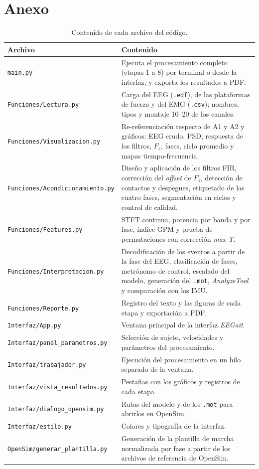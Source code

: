 \documentclass[10pt]{article}
\begin{document}
\section{Anexo}

\begin{table}[H]
\centering
\small
\footnotesize
\begin{tabular}{>{\raggedright\arraybackslash}p{4.6cm}>{\raggedright\arraybackslash}p{9.5cm}}
\toprule
Archivo & Contenido \\
\midrule
\texttt{main.py} & Ejecuta el procesamiento completo (etapas 1 a 8) por terminal o desde la interfaz, y exporta los resultados a PDF. \\
\texttt{Funciones/Lectura.py} & Carga del EEG (\texttt{.edf}), de las plataformas de fuerza y del EMG (\texttt{.csv}); nombres, tipos y montaje 10--20 de los canales. \\
\texttt{Funciones/Visualizacion.py} & Re-referenciación respecto de A1 y A2 y gráficos: EEG crudo, PSD, respuesta de los filtros, $F_z$, fases, ciclo promedio y mapas tiempo-frecuencia. \\
\texttt{Funciones/Acondicionamiento.py} & Diseño y aplicación de los filtros FIR, corrección del \textit{offset} de $F_z$, detección de contactos y despegues, etiquetado de las cuatro fases, segmentación en ciclos y control de calidad. \\
\texttt{Funciones/Features.py} & STFT continua, potencia por banda y por fase, índice GPM y prueba de permutaciones con corrección \textit{max-T}. \\
\texttt{Funciones/Interpretacion.py} & Decodificación de los eventos a partir de la fase del EEG, clasificación de fases, metrónomo de control, escalado del modelo, generación del \texttt{.mot}, \textit{AnalyzeTool} y comparación con los IMU. \\
\texttt{Funciones/Reporte.py} & Registro del texto y las figuras de cada etapa y exportación a PDF. \\
\texttt{Interfaz/App.py} & Ventana principal de la interfaz \textit{EEGait}. \\
\texttt{Interfaz/panel\_parametros.py} & Selección de sujeto, velocidades y parámetros del procesamiento. \\
\texttt{Interfaz/trabajador.py} & Ejecución del procesamiento en un hilo separado de la ventana. \\
\texttt{Interfaz/vista\_resultados.py} & Pestañas con los gráficos y registros de cada etapa. \\
\texttt{Interfaz/dialogo\_opensim.py} & Rutas del modelo y de los \texttt{.mot} para abrirlos en OpenSim. \\
\texttt{Interfaz/estilo.py} & Colores y tipografía de la interfaz. \\
\texttt{OpenSim/generar\_plantilla.py} & Generación de la plantilla de marcha normalizada por fase a partir de los archivos de referencia de OpenSim. \\
\bottomrule
\end{tabular}
\vspace{1mm}
\caption{Contenido de cada archivo del código.}
\label{tab:archivos}
\end{table}
\end{document}
